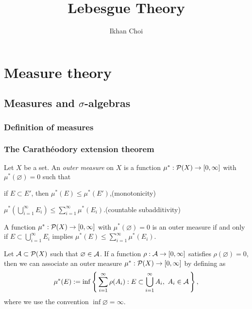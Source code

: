 \documentclass{../note}
\begin{document}
\title{Lebesgue Theory}
\author{Ikhan Choi}
\maketitle
\tableofcontents

\part{Measure theory}


\chapter{Measures and $\sigma$-algebras}

\section{Definition of measures}

\section{The Carath\'eodory extension theorem}
\begin{prb}
Let $X$ be a set.
An \emph{outer measure} on $X$ is a function $\mu^*:\mathcal{P}(X)\to[0,\infty]$ with $\mu^*(\varnothing)=0$ such that
\begin{parts}[(i)]
\item if $E\subset E'$, then $\mu^*(E)\le\mu^*(E')$,\hfill(monotonicity)
\item $\mu^*(\bigcup_{i=1}^\infty E_i)\le\sum_{i=1}^\infty\mu^*(E_i)$.\hfill(countable subadditivity)
\end{parts}

\begin{parts}
\item A function $\mu^*:\mathcal{P}(X)\to[0,\infty]$ with $\mu^*(\varnothing)=0$ is an outer measure if and only if $E\subset\bigcup_{i=1}^\infty E_i$ implies $\mu^*(E)\le\sum_{i=1}^\infty\mu^*(E_i)$.
\item
Let $\mathcal{A}\subset\mathcal{P}(X)$ such that $\varnothing\in\mathcal{A}$.
If a function $\rho:\mathcal{A}\to[0,\infty]$ satisfies $\rho(\varnothing)=0$, then we can associate an outer measure $\mu^*:\mathcal{P}(X)\to[0,\infty]$ by defining as
\[\mu^*(E):=\inf\left\{\,\sum_{i=1}^\infty\rho(A_i):E\subset\bigcup_{i=1}^\infty A_i,\ A_i\in\mathcal{A}\,\right\},\]
where we use the convention $\inf\varnothing=\infty$.
\end{parts}
\end{prb}
\end{document}

